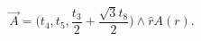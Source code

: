 \begin{equation} \vec{A}=  \Big( t_4,t_5,\frac{t_3} {2} + \frac{\sqrt{3} t_8}{2} \Big)
   \wedge \hat{r} A(r).      \qquad  \end{equation}

